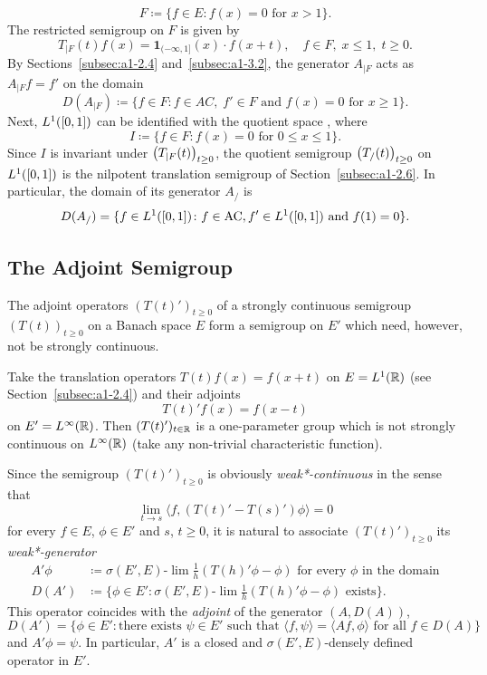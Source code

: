 \begin{example*}
\[
    F \coloneq \{f \in E \colon f(x) = 0 \text{ for } x > 1\}.
\]
The restricted semigroup on $F$ is given by
\[
    T_{\vert F}(t)f(x) = \mathbf{1}_{(-\infty,1]}(x) \cdot f(x+t),
    \quad f \in F,\; x \leq 1,\; t \geq 0.
\]
By Sections~\ref{subsec:a1-2.4} and~\ref{subsec:a1-3.2}, the generator 
$A_{\vert F}$ acts as $A_{\vert F}f = f'$ on the domain
\[
    D(A_{\vert F}) \coloneq \{f \in F \colon f \in AC,\; 
    f' \in F \text{ and } f(x) = 0 \text{ for } x \geq 1\}.
\]
Next, $L^{1}(\left[ 0,1 \right])$ can be identified with the quotient space 
, where
\[
    I \coloneq \{f \in F \colon f(x) = 0 \text{ for } 0 \leq x \leq 1\}.
\]
Since $I$ is invariant under $\mleft(T_{\vert F}(t)\mright)_{t \geq 0}$, 
the quotient semigroup $\mleft(T_{/}(t)\mright)_{t \geq 0}$ on 
$L^{1}(\left[ 0,1 \right])$ is the nilpotent translation semigroup of 
Section~\ref{subsec:a1-2.6}.
In particular, the domain of its generator $A_{/}$ is
\[
    D(A_{/}) = \{f \in L^{1}(\left[ 0,1 \right]) \colon f \in \mathrm{AC},  
    f' \in L^{1}(\left[ 0,1 \right]) \text{ and } f(1) = 0\}.
\]
\end{example*}
\subsection{The Adjoint Semigroup}\label{subsec:a1-3.5}%
The adjoint operators $(T(t)')_{t \geq 0}$ of a strongly continuous semigroup $(T(t))_{t \geq 0}$ on a Banach space $E$ form a semigroup on $E'$ which need, however, not be strongly continuous.
\begin{example*}\label{ex:a1-3.2}
Take the translation operators $T(t)f(x) = f(x+t)$ on $E = L^{1}(\mathbb{R})$ (see Section~\ref{subsec:a1-2.4}) and their adjoints
\[
    T(t)'f(x) = f(x-t)
\]
on $E' = L^{\infty}(\mathbb{R})$.
Then $(T(t)')_{t \in \mathbb{R}}$ is a one-parameter group which is not strongly continuous on $L^{\infty}(\mathbb{R})$ (take any non-trivial characteristic function).
\end{example*}
Since the semigroup $(T(t)')_{t \geq 0}$ is 
obviously \emph{weak*-continuous} in the sense that 
\[
\lim_{t \to s} \langle f,(T(t)'-T(s)')\phi \rangle = 0
\]
for every $f \in E$, $\phi \in E'$ and $s$, $t \geq 0$, it is natural to associate $(T(t)')_{t \geq 0}$ its  \emph{weak*-generator}
\begin{align*}
    A'\phi &\coloneq \sigma(E',E)\text{-}\lim\frac{1}{h}(T(h)'\phi-\phi) \text{ for every } \phi \text{ in the domain} \\
    D(A') &\coloneq \{\phi \in E' \colon \sigma(E',E)\text{-}\lim\frac{1}{h}(T(h)'\phi-\phi) \text{ exists}\}.
\end{align*}
This operator coincides with the \emph{adjoint} of the generator $(A,D(A))$, \ie
\[
    D(A') = \{\phi \in E' \colon \text{there exists } \psi \in E' \text{ such that } \langle f,\psi \rangle = \langle Af,\phi \rangle \text{ for all } f \in D(A)\}
\]
and $A'\phi = \psi$.
In particular, $A'$ is a closed and $\sigma(E',E)$-densely defined operator in $E'$.

